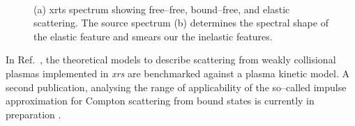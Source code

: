 \documentclass[12pt]{scrartcl}
\begin{document}
\begin{figure}[ht]
  \begin{center}
    \\
  \end{center}
  \caption{(a) \gls{xrts} spectrum showing free--free, bound--free, and elastic
  scattering. The source spectrum (b) determines the spectral shape of the elastic
feature and smears our the inelastic features.}
  \label{fig:xrts_spectrum_and_source}
\end{figure}

In Ref.~\cite{Rozmus2017_submitted}, the theoretical models to describe
scattering from weakly collisional plasmas implemented in \textit{xrs} are
benchmarked against a plasma kinetic model. A second publication, analysing the
range of applicability of the so--called impulse approximation for Compton
scattering from bound states is currently in preparation \cite{Bell2017_prep}.
%
\FloatBarrier
\end{document}
